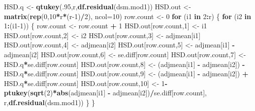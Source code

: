 \documentclass[
]{book}
\newenvironment{Shaded}{\begin{snugshade}}{\end{snugshade}}
\newcommand{\AttributeTok}[1]{\textcolor[rgb]{0.13,0.29,0.53}{#1}}
\newcommand{\ControlFlowTok}[1]{\textcolor[rgb]{0.13,0.29,0.53}{\textbf{#1}}}
\newcommand{\DecValTok}[1]{\textcolor[rgb]{0.00,0.00,0.81}{#1}}
\newcommand{\FunctionTok}[1]{\textcolor[rgb]{0.13,0.29,0.53}{\textbf{#1}}}
\newcommand{\NormalTok}[1]{#1}
\newcommand{\OtherTok}[1]{\textcolor[rgb]{0.56,0.35,0.01}{#1}}
\newcommand{\SpecialCharTok}[1]{\textcolor[rgb]{0.81,0.36,0.00}{\textbf{#1}}}
\begin{document}
\begin{Shaded}
\begin{Highlighting}[]
\NormalTok{HSD.q }\OtherTok{\textless{}{-}} \FunctionTok{qtukey}\NormalTok{(.}\DecValTok{95}\NormalTok{,r,}\FunctionTok{df.residual}\NormalTok{(dsm.mod1)) }
\NormalTok{HSD.out }\OtherTok{\textless{}{-}} \FunctionTok{matrix}\NormalTok{(}\FunctionTok{rep}\NormalTok{(}\DecValTok{0}\NormalTok{,}\DecValTok{10}\SpecialCharTok{*}\NormalTok{r}\SpecialCharTok{*}\NormalTok{(r}\DecValTok{{-}1}\NormalTok{)}\SpecialCharTok{/}\DecValTok{2}\NormalTok{), }\AttributeTok{ncol=}\DecValTok{10}\NormalTok{)}
\NormalTok{row.count }\OtherTok{\textless{}{-}} \DecValTok{0}
\ControlFlowTok{for}\NormalTok{ (i1 }\ControlFlowTok{in} \DecValTok{2}\SpecialCharTok{:}\NormalTok{r) \{}
  \ControlFlowTok{for}\NormalTok{ (i2 }\ControlFlowTok{in} \DecValTok{1}\SpecialCharTok{:}\NormalTok{(i1}\DecValTok{{-}1}\NormalTok{)) \{}
\NormalTok{    row.count }\OtherTok{\textless{}{-}}\NormalTok{ row.count }\SpecialCharTok{+} \DecValTok{1}
\NormalTok{    HSD.out[row.count,}\DecValTok{1}\NormalTok{] }\OtherTok{\textless{}{-}}\NormalTok{ i1}
\NormalTok{    HSD.out[row.count,}\DecValTok{2}\NormalTok{] }\OtherTok{\textless{}{-}}\NormalTok{ i2}
\NormalTok{    HSD.out[row.count,}\DecValTok{3}\NormalTok{] }\OtherTok{\textless{}{-}}\NormalTok{ adjmean[i1]}
\NormalTok{    HSD.out[row.count,}\DecValTok{4}\NormalTok{] }\OtherTok{\textless{}{-}}\NormalTok{ adjmean[i2]}
\NormalTok{    HSD.out[row.count,}\DecValTok{5}\NormalTok{] }\OtherTok{\textless{}{-}}\NormalTok{ adjmean[i1] }\SpecialCharTok{{-}}\NormalTok{ adjmean[i2]}
\NormalTok{    HSD.out[row.count,}\DecValTok{6}\NormalTok{] }\OtherTok{\textless{}{-}}\NormalTok{ se.diff[row.count]}
\NormalTok{    HSD.out[row.count,}\DecValTok{7}\NormalTok{] }\OtherTok{\textless{}{-}}\NormalTok{ HSD.q}\SpecialCharTok{*}\NormalTok{se.diff[row.count]}
\NormalTok{    HSD.out[row.count,}\DecValTok{8}\NormalTok{] }\OtherTok{\textless{}{-}} 
\NormalTok{      (adjmean[i1] }\SpecialCharTok{{-}}\NormalTok{ adjmean[i2]) }\SpecialCharTok{{-}}\NormalTok{ HSD.q}\SpecialCharTok{*}\NormalTok{se.diff[row.count]}
\NormalTok{    HSD.out[row.count,}\DecValTok{9}\NormalTok{] }\OtherTok{\textless{}{-}} 
\NormalTok{      (adjmean[i1] }\SpecialCharTok{{-}}\NormalTok{ adjmean[i2]) }\SpecialCharTok{+}\NormalTok{ HSD.q}\SpecialCharTok{*}\NormalTok{se.diff[row.count]}
\NormalTok{    HSD.out[row.count,}\DecValTok{10}\NormalTok{] }\OtherTok{\textless{}{-}} 
      \DecValTok{1}\SpecialCharTok{{-}}\FunctionTok{ptukey}\NormalTok{(}\FunctionTok{sqrt}\NormalTok{(}\DecValTok{2}\NormalTok{)}\SpecialCharTok{*}\FunctionTok{abs}\NormalTok{(adjmean[i1] }\SpecialCharTok{{-}}\NormalTok{ adjmean[i2])}\SpecialCharTok{/}\NormalTok{se.diff[row.count],}
\NormalTok{               r,}\FunctionTok{df.residual}\NormalTok{(dsm.mod1))}
\NormalTok{  \}}
\NormalTok{\}}


\end{Highlighting}
\end{Shaded}
\end{document}
